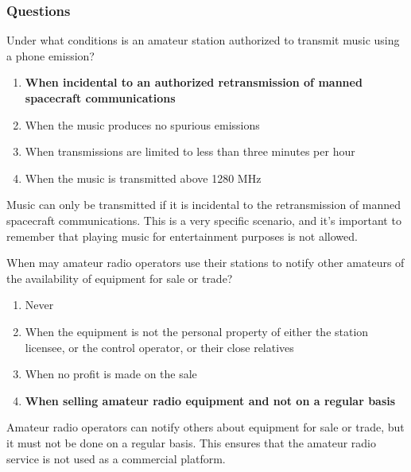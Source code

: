 \subsubsection{Questions}

\begin{tcolorbox}[colback=gray!10!white,colframe=black!75!black,title={T1D04}]
    Under what conditions is an amateur station authorized to transmit music using a phone emission?
    \begin{enumerate}[label=\Alph*),noitemsep]
        \item \textbf{When incidental to an authorized retransmission of manned spacecraft communications}
        \item When the music produces no spurious emissions
        \item When transmissions are limited to less than three minutes per hour
        \item When the music is transmitted above 1280 MHz
    \end{enumerate}
\end{tcolorbox}

Music can only be transmitted if it is incidental to the retransmission of manned spacecraft communications. This is a very specific scenario, and it's important to remember that playing music for entertainment purposes is not allowed.

\begin{tcolorbox}[colback=gray!10!white,colframe=black!75!black,title={T1D05}]
    When may amateur radio operators use their stations to notify other amateurs of the availability of equipment for sale or trade?
    \begin{enumerate}[label=\Alph*),noitemsep]
        \item Never
        \item When the equipment is not the personal property of either the station licensee, or the control operator, or their close relatives
        \item When no profit is made on the sale
        \item \textbf{When selling amateur radio equipment and not on a regular basis} 
    \end{enumerate}
\end{tcolorbox}

Amateur radio operators can notify others about equipment for sale or trade, but it must not be done on a regular basis. This ensures that the amateur radio service is not used as a commercial platform.



